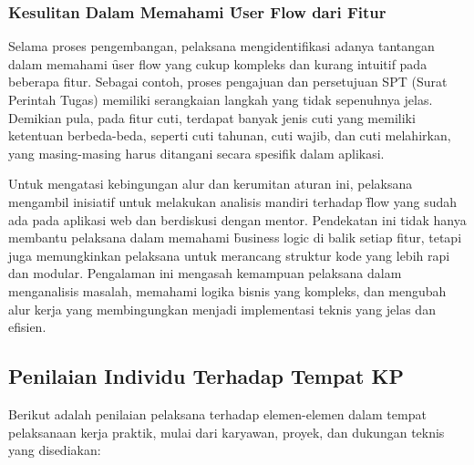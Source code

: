 \subsubsection{Kesulitan Dalam Memahami \f{User Flow} dari Fitur}
\label{sec:kendalaUserFlow}
Selama proses pengembangan, pelaksana mengidentifikasi adanya tantangan dalam
memahami \f{user flow} yang cukup kompleks dan kurang intuitif pada beberapa
fitur. Sebagai contoh, proses pengajuan dan persetujuan SPT (Surat Perintah
Tugas) memiliki serangkaian langkah yang tidak sepenuhnya jelas. Demikian pula,
pada fitur cuti, terdapat banyak jenis cuti yang memiliki ketentuan berbeda-beda,
seperti cuti tahunan, cuti wajib, dan cuti melahirkan, yang masing-masing harus
ditangani secara spesifik dalam aplikasi.

Untuk mengatasi kebingungan alur dan kerumitan aturan ini, pelaksana mengambil
inisiatif untuk melakukan analisis mandiri terhadap \f{flow} yang sudah ada pada
aplikasi web dan berdiskusi dengan mentor. Pendekatan ini tidak hanya membantu
pelaksana dalam memahami \f{business logic} di balik setiap fitur, tetapi juga
memungkinkan pelaksana untuk merancang struktur kode yang lebih rapi dan modular.
Pengalaman ini mengasah kemampuan pelaksana dalam menganalisis masalah, memahami
logika bisnis yang kompleks, dan mengubah alur kerja yang membingungkan menjadi
implementasi teknis yang jelas dan efisien.

\subsection{Penilaian Individu Terhadap Tempat KP}
\label{sec:penilaianTempatKp}
Berikut adalah penilaian pelaksana terhadap elemen-elemen dalam tempat
pelaksanaan kerja praktik, mulai dari karyawan, proyek, dan dukungan teknis
yang disediakan:

